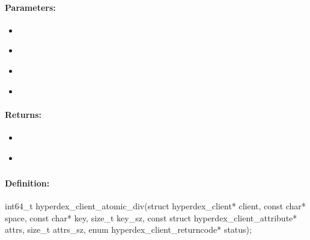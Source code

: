 \paragraph{Parameters:}
\begin{itemize}[noitemsep]
\item {}\\

\item {}\\

\item {}\\

\item {}\\

\end{itemize}

\paragraph{Returns:}
\begin{itemize}[noitemsep]
\item {}\\

\item {}\\

\end{itemize}

\pagebreak
\subsubsection{}
\label{api:c:atomic_div}


\paragraph{Definition:}
\begin{ccode}
int64_t hyperdex_client_atomic_div(struct hyperdex_client* client,
        const char* space,
        const char* key, size_t key_sz,
        const struct hyperdex_client_attribute* attrs, size_t attrs_sz,
        enum hyperdex_client_returncode* status);
\end{ccode}

